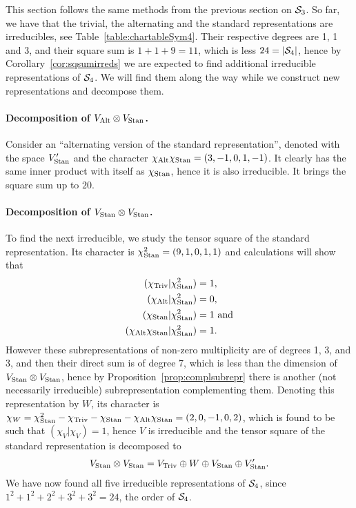 \begin{example}
	This section follows the same methods from the previous section on $\mathcal{S}_3$. So far, we have that the trivial, the alternating and the standard representations are irreducibles, see Table~\ref{table:chartableSym4}. Their respective degrees are 1, 1 and 3, and their square sum is $1+1+9 = 11$, which is less $24 = |\mathcal{S}_4|$, hence by Corollary~\ref{cor:sqsumirreds} we are expected to find additional irreducible representations of $\mathcal{S}_4$. We will find them along the way while we construct new representations and decompose them.
	
	\paragraph{Decomposition of $V_{\text{Alt}} \otimes V_{\text{Stan}}$.} Consider an ``alternating version of the standard representation'', denoted with the space $V'_{\text{Stan}}$ and the character $\chi_{\text{Alt}}\chi_{\text{Stan}} = (3,-1,0,1,-1)$. It clearly has the same inner product with itself as $\chi_{\text{Stan}}$, hence it is also irreducible. It brings the square sum up to $20$.
	
	\paragraph{Decomposition of $V_{\text{Stan}} \otimes V_{\text{Stan}}$.} To find the next irreducible, we study the tensor square of the standard representation. Its character is $\chi_{\text{Stan}}^2 = (9,1,0,1,1)$ and calculations will show that
	\begin{align*}
		(\chi_{\text{Triv}} | \chi_{\text{Stan}}^2) & = 1, \\
		(\chi_{\text{Alt}} | \chi_{\text{Stan}}^2)  &= 0, \\
		(\chi_{\text{Stan}} | \chi_{\text{Stan}}^2)  &= 1 \text{ and} \\
		(\chi_{\text{Alt}}\chi_{\text{Stan}} | \chi_{\text{Stan}}^2)  &= 1.
	\end{align*}
	However these subrepresentations of non-zero multiplicity are of degrees 1, 3, and 3, and then their direct sum is of degree 7, which is less than the dimension of $V_{\text{Stan}} \otimes V_{\text{Stan}}$, hence by Proposition~\ref{prop:complsubrepr} there is another (not necessarily irreducible) subrepresentation complementing them. Denoting this representation by $W$, its character is $\chi_W = \chi_{\text{Stan}}^2 - \chi_{\text{Triv}} - \chi_{\text{Stan}} - \chi_{\text{Alt}}\chi_{\text{Stan}} = (2,0,-1,0,2)$, which is found to be such that $(\chi_V|\chi_V) = 1$, hence $V$ is irreducible and  the tensor square of the standard representation is decomposed to 
	\begin{align*}
		V_{\text{Stan}} \otimes V_{\text{Stan}} = V_{\text{Triv}} \oplus W \oplus V_{\text{Stan}} \oplus V'_{\text{Stan}}.
	\end{align*}
	We have now found all five irreducible representations of $\mathcal{S}_4$, since $1^2 + 1^2 +  2^2 + 3^2 + 3^2 = 24$, the order of $\mathcal{S}_4$.
	

\end{example}
